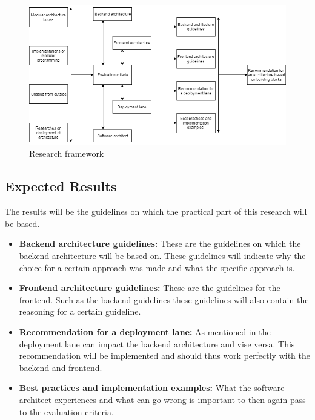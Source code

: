 \begin{figure}[H]
	\includegraphics[width=\linewidth]{research_framework.png}
	\caption{Research framework}
\end{figure}

\subsection{Expected Results}

The results will be the guidelines on which the practical part of this research will be based.

\begin{itemize}
	\item \textbf{Backend architecture guidelines: } These are the guidelines on which the backend architecture will be based on. These guidelines will indicate why the choice for a certain approach was made and what the specific approach is.

	\item \textbf{Frontend architecture guidelines: } These are the guidelines for the frontend. Such as the backend guidelines these guidelines will also contain the reasoning for a certain guideline.

	\item \textbf{Recommendation for a deployment lane: } As mentioned in  the deployment lane can impact the backend architecture and vise versa. This recommendation will be implemented and should thus work perfectly with the backend and frontend.

	\item \textbf{Best practices and implementation examples: } What the software architect experiences and what can go wrong is important to then again pass to the evaluation criteria.
\end{itemize}

